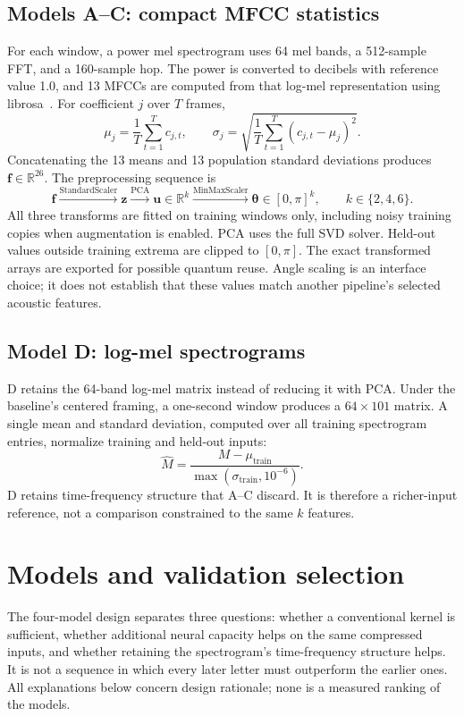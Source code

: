 \documentclass[11pt,letterpaper]{article}
\newcommand{\R}{\mathbb{R}}
\begin{document}
\subsection{Models A--C: compact MFCC statistics}
For each window, a power mel spectrogram uses 64 mel bands, a 512-sample FFT,
and a 160-sample hop. The power is converted to decibels with reference value
1.0, and 13 MFCCs are computed from that log-mel representation using
librosa~\cite{librosa}. For coefficient $j$ over $T$ frames,
\begin{equation}
 \mu_j=\frac{1}{T}\sum_{t=1}^{T}c_{j,t},\qquad
 \sigma_j=\sqrt{\frac{1}{T}\sum_{t=1}^{T}(c_{j,t}-\mu_j)^2}.
\end{equation}
Concatenating the 13 means and 13 population standard deviations produces
$\mathbf{f}\in\R^{26}$. The preprocessing sequence is
\begin{equation}
 \mathbf{f}\xrightarrow{\text{StandardScaler}}\mathbf{z}
 \xrightarrow{\text{PCA}}\mathbf{u}\in\R^k
 \xrightarrow{\text{MinMaxScaler}}\boldsymbol{\theta}\in[0,\pi]^k,
 \qquad k\in\{2,4,6\}.
\end{equation}
All three transforms are fitted on training windows only, including noisy
training copies when augmentation is enabled. PCA uses the full SVD solver.
Held-out values outside training extrema are clipped to $[0,\pi]$.
The exact transformed arrays are exported for possible quantum reuse.
Angle scaling is an interface choice; it does not establish that these values
match another pipeline's selected acoustic features.

\subsection{Model D: log-mel spectrograms}
D retains the 64-band log-mel matrix instead of reducing it with PCA. Under
the baseline's centered framing, a one-second window produces a $64\times101$
matrix. A single mean and standard deviation, computed over all training
spectrogram entries, normalize training and held-out inputs:
\begin{equation}
 \widehat{M}=\frac{M-\mu_{\mathrm{train}}}
 {\max(\sigma_{\mathrm{train}},10^{-6})}.
\end{equation}
D retains time-frequency structure that A--C discard. It is therefore a
richer-input reference, not a comparison constrained to the same $k$ features.

\section{Models and validation selection}
The four-model design separates three questions: whether a conventional kernel
is sufficient, whether additional neural capacity helps on the same compressed
inputs, and whether retaining the spectrogram's time-frequency structure helps.
It is not a sequence in which every later letter must outperform the earlier
ones. All explanations below concern design rationale; none is a measured
ranking of the models.
\end{document}

